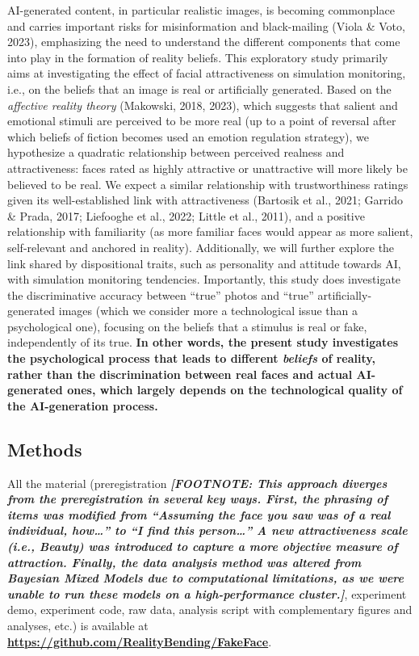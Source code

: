\documentclass[
  man,
  floatsintext,
  longtable,
  nolmodern,
  notxfonts,
  notimes,
  colorlinks=true,linkcolor=blue,citecolor=blue,urlcolor=blue]{apa7}
\begin{document}
AI-generated content, in particular realistic images, is becoming
commonplace and carries important risks for misinformation and
black-mailing (Viola \& Voto, 2023), emphasizing the need to understand
the different components that come into play in the formation of reality
beliefs. This exploratory study primarily aims at investigating the
effect of facial attractiveness on simulation monitoring, i.e., on the
beliefs that an image is real or artificially generated. Based on the
\emph{affective reality theory} (Makowski, 2018, 2023), which suggests
that salient and emotional stimuli are perceived to be more real (up to
a point of reversal after which beliefs of fiction becomes used an
emotion regulation strategy), we hypothesize a quadratic relationship
between perceived realness and attractiveness: faces rated as highly
attractive or unattractive will more likely be believed to be real. We
expect a similar relationship with trustworthiness ratings given its
well-established link with attractiveness (Bartosik et al., 2021;
Garrido \& Prada, 2017; Liefooghe et al., 2022; Little et al., 2011),
and a positive relationship with familiarity (as more familiar faces
would appear as more salient, self-relevant and anchored in reality).
Additionally, we will further explore the link shared by dispositional
traits, such as personality and attitude towards AI, with simulation
monitoring tendencies. Importantly, this study does investigate the
discriminative accuracy between ``true'' photos and ``true''
artificially-generated images (which we consider more a technological
issue than a psychological one), focusing on the beliefs that a stimulus
is real or fake, independently of its true. \textbf{In other words, the
present study investigates the psychological process that leads to
different \emph{beliefs} of reality, rather than the discrimination
between real faces and actual AI-generated ones, which largely depends
on the technological quality of the AI-generation process.}

\subsection{Methods}\label{methods}

All the material (preregistration \textbf{\emph{{[}FOOTNOTE: This
approach diverges from the preregistration in several key ways. First,
the phrasing of items was modified from ``Assuming the face you saw was
of a real individual, how\ldots{}'' to ``I find this person\ldots{}'' A
new attractiveness scale (i.e., Beauty) was introduced to capture a more
objective measure of attraction. Finally, the data analysis method was
altered from Bayesian Mixed Models due to computational limitations, as
we were unable to run these models on a high-performance cluster.{]}}},
experiment demo, experiment code, raw data, analysis script with
complementary figures and analyses, etc.) is available at
\href{https://github.com/RealityBending/FakeFace}{\textbf{https://github.com/RealityBending/FakeFace}}.
\end{document}
